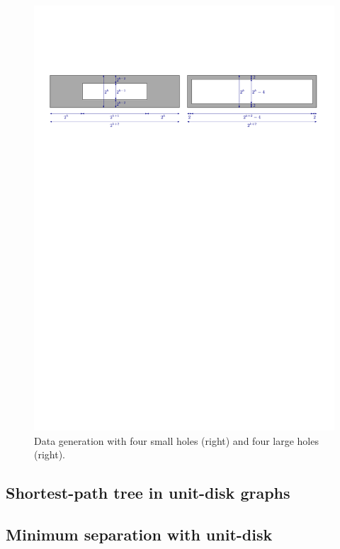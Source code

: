 \documentclass[a4paper,USenglish,numberwithinsect]{lipics}
\begin{document}
\begin{figure}
	\includegraphics[width=\textwidth,page=2]{data_generation}
	\caption{Data generation with four small holes (right) and four large holes (right).}
	\label{fig:data_generation}
\end{figure}


\subsection{Shortest-path tree in unit-disk graphs}
\label{sec:experiments-sptree}

\subsection{Minimum separation with unit-disk}
\label{sec:experiments-separation}
\end{document}
